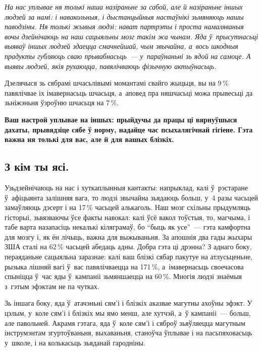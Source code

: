 \emph{На нас уплывае ня толькі наша назіраньне за сабой, але й назіраньне іншых людзей за намі: і навакольныя, і дыстанцыйныя настаўнікі зьмяняюць нашы паводзіны. Ня толькі жывыя людзі: нават партрэты і проста намаляваныя вочы дзейнічаюць на наш сацыяльны мозг такім жа чынам. Яда ў~прысутнасьці выяваў іншых людзей здаецца смачнейшай, чым звычайна, а~вось шкодныя прадукты губляюць сваю прывабнасьць~--- у~параўнаньні зь ядой на самоце. А выявы людзей, якія рухаюцца, павялічваюць фізычную актыўнасьць.}

Дзелячыся зь сябрамі шчасьлівымі момантамі свайго жыцьця, вы на 9\,\% павялічвае іх імавернасьць шчасьця, а~аповед пра няшчасьці можа прывесьці да зьніжэньня ўзроўню шчасьця на 7\,\%.

\textbf{Ваш настрой уплывае на іншых: прыйдучы да працы ці вярнуўшыся дахаты, прывядзіце сябе ў норму, надайце час псыхалягічнай гігіене. Гэта важна ня толькі для вас, але й для вашых блізкіх.}

\subsection*{З кім ты ясі.}

Узьдзейнічаюць на нас і хуткаплынныя кантакты: напрыклад, калі ў~рэстаране ў~афіцыянта залішняя вага, то людзі звычайна зьядаюць больш, у~4 разы часьцей замаўляюць дэсерт і на 17\,\% часьцей алькаголь. Наш мозг схільны прыдумляць гісторыі, зьвязваючы ўсе факты навокал: калі ўсё вакол тоўстыя, то, магчыма, і табе варта назапасіць некалькі кіляграмаў, бо ``быць як усе''~--- гэта камфортна для мозгу і, як ён лічыць, важна для выжываньня. За апошнія два гады жыхары ЗША сталі на 62\,\% часьцей абедаць адны. Добра гэта ці дрэнна? З аднаго боку, пераяданьне сацыяльна заразнае: калі ваш блізкі сябар пакутуе на атлусьценьне, рызыка лішняй вагі ў~вас павялічваецца на 171\,\%, а~імавернасьць своечасова спыніцца ў~час яды ў~кампаніі зьмяншаецца на 60\,\%. Многія людзі знаёмыя з~гэтым эфэктам не па чутках.


Зь іншага боку, яда ў~атачэньні сям'і і блізкіх аказвае магутны ахоўны эфэкт. У цэлым, у~коле сям'і і блізкіх мы ямо менш, але хутчэй, а~ў кампаніі~--- больш, але павольней. Акрамя гэтага, яда ў~коле сям'і і сяброў зьяўляецца магутным інструмэнтам згуртоўваньня, выхаваньня, станоўча ўплывае і на пасьпяховасьць у~школе, і на колькасьць зьяданай гародніны.

